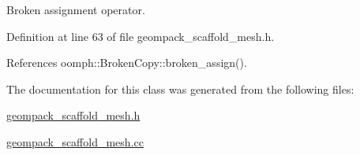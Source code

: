 Broken assignment operator. 



Definition at line 63 of file geompack\+\_\+scaffold\+\_\+mesh.\+h.



References oomph\+::\+Broken\+Copy\+::broken\+\_\+assign().



The documentation for this class was generated from the following files\+:\begin{DoxyCompactItemize}
\item 
\hyperlink{geompack__scaffold__mesh_8h}{geompack\+\_\+scaffold\+\_\+mesh.\+h}\item 
\hyperlink{geompack__scaffold__mesh_8cc}{geompack\+\_\+scaffold\+\_\+mesh.\+cc}\end{DoxyCompactItemize}
